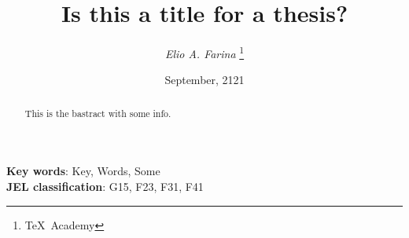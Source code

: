 \documentclass[11pt]{article}
\begin{document}
\title{\textbf{Is this a title for a thesis?}}
\vspace{1 in}
\author{
\textit{Elio A. Farina}
\thanks{\TeX\ Academy}}
\date{September, 2121}
\maketitle
\thispagestyle{empty}
\begin{abstract}\noindent
This is the bastract with some info.

\lipsum[1-2]
\end{abstract}
\textbf{Key words}: Key, Words, Some \\
\textbf{JEL classification}: G15, F23, F31, F41
\end{document}
